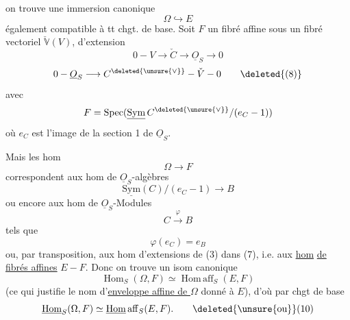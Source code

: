 on trouve une  immersion canonique
\[
\Omega\hookrightarrow E \tag*{(6)}
\]
également compatible à tt chgt. de base. Soit
 $F$ un fibré affine sous
un fibré vectoriel $\check{\mathbb V}(V)$, 
 d'extension
\[
0\mathbin{-}V\longrightarrow\check C\longrightarrow\underline{O}_S\longrightarrow0 \tag*{(7)}
\]
\[
0\mathbin{-}\underline{O}_S\longrightarrow C^{\deleted{\unsure{\vee}}}\mathbin{-}\check V\mathbin{-}0 \tag*{\deleted{(8)}}
\]
avec
\[
F=\operatorname{Spec}(\underline{\mathrm{Sym}}\, C^{\deleted{\unsure{\vee}}}/(e_C-1))
\]
où $e_C$ est l'image  de la section 1 de $\underline{O}_S$.

Mais les hom
\[
\Omega\longrightarrow F
\]
correspondent aux hom de $\underline{O}_S$-algèbres
\[
\underline{\mathrm{Sym}}(C)/(e_C-1)\longrightarrow B
\]
ou encore aux hom de $\underline{O}_S$-Modules
\[
C\xrightarrow{\varphi}B
\]
tels que
\[
\varphi(e_C)=e_B
\]
ou, par transposition, aux hom d'extensions de
(3) dans (7), i.e. aux \uline{hom} \uline{de fibrés affines}
$E\mathbin{-}F$. Donc on trouve un isom canonique
\[
\operatorname{Hom}_S(\Omega,F)\simeq\operatorname{Hom\,aff}_S(E,F) \tag*{(9)}
\]
(ce qui justifie le nom d'\uline{enveloppe affine de $\Omega$}
donné à $E$), d'où par chgt de base
\[
\underline{\mathrm{Hom}}_S(\Omega,F)\simeq\underline{\mathrm{Hom}}\,\mathrm{aff}_S(E,F).\tag*{\deleted{\unsure{ou}}(10)}
\]



